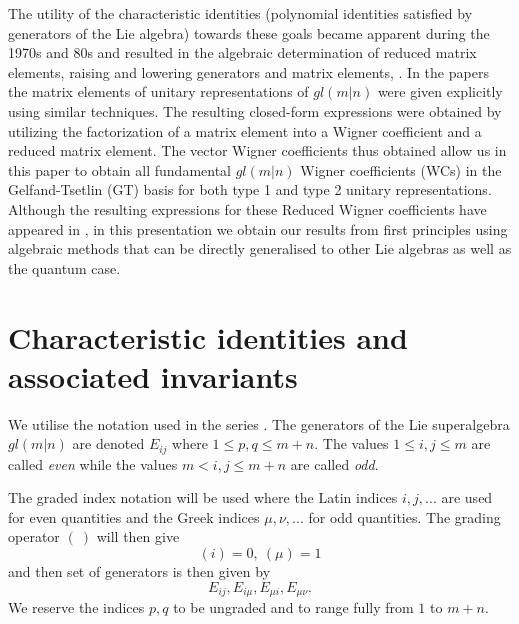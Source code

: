 \documentclass[12pt]{article}
\begin{document}
The utility of the characteristic identities (polynomial identities satisfied by generators of the Lie algebra) towards these goals became apparent during the 1970s and 80s and resulted in the algebraic determination of reduced matrix elements, \cite{Gould1978} raising and lowering generators \cite{Gould1980} and matrix elements, \cite{Gould1981,Gould1981b}. In the papers \cite{GIW2,GIW3} the matrix elements of unitary representations of $gl(m|n)$ were given explicitly using similar techniques. The resulting closed-form expressions were obtained by utilizing the factorization of a matrix element into a Wigner coefficient and a reduced matrix element. The vector Wigner coefficients thus obtained allow us in this paper to obtain all fundamental $gl(m|n)$ Wigner coefficients (WCs) in the Gelfand-Tsetlin (GT) basis for both type 1 and type 2 unitary representations. Although the resulting expressions for these Reduced Wigner coefficients have appeared in \cite{StoiVan2010}, in this presentation we obtain our results from first principles using algebraic methods that can be directly generalised to other Lie algebras as well as the quantum case.
 


\section{Characteristic identities and associated invariants}
\label{prelim}

We utilise the notation used in the series \cite{GIW1,GIW2,GIW3}. The generators of the Lie superalgebra $gl(m|n)$ are denoted $E_{ij}$ where $1 \leq p,q \leq m+n$. The values $1 \leq i,j \leq m$ are called \textit{even} while the values $m < i,j \leq m+n$ are called \textit{odd}.

The graded index notation will be used where the Latin indices $i,j,...$ are used for even quantities and the Greek indices $\mu, \nu, ...$ for odd quantities. The grading operator $(~)$ will then give
$$
(i) = 0,~(\mu) = 1
$$
and then set of generators is then given by 
$$
E_{ij}, E_{i\mu}, E_{\mu i}, E_{\mu\nu}.
$$
We reserve the indices $p,q$ to be ungraded and to range fully from $1$ to $m+n$.
\end{document}
